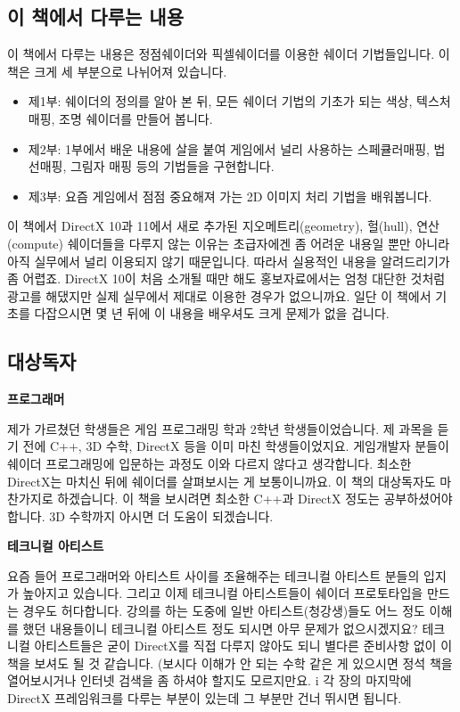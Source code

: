 \subsection{이 책에서 다루는 내용}

이 책에서 다루는 내용은 정점쉐이더와 픽셀쉐이더를 이용한 쉐이더 기법들입니다. 이 책은 크게 세 부분으로 나뉘어져 있습니다.

\begin{itemize}
    \item 제1부: 쉐이더의 정의를 알아 본 뒤, 모든 쉐이더 기법의 기초가 되는 색상, 텍스처 매핑, 조명 쉐이더를 만들어 봅니다.
    \item 제2부: 1부에서 배운 내용에 살을 붙여 게임에서 널리 사용하는 스페큘러매핑, 법선매핑, 그림자 매핑 등의 기법들을 구현합니다.
    \item 제3부: 요즘 게임에서 점점 중요해져 가는 2D 이미지 처리 기법을 배워봅니다.
\end{itemize}


이 책에서 DirectX 10과 11에서 새로 추가된 지오메트리(geometry), 헐(hull), 연산(compute) 쉐이더들을 다루지 않는 이유는 초급자에겐 좀 어려운 내용일 뿐만 아니라 아직 실무에서 널리 이용되지 않기 때문입니다. 따라서 실용적인 내용을 알려드리기가 좀 어렵죠. DirectX 10이 처음 소개될 때만 해도 홍보자료에서는 엄청 대단한 것처럼 광고를 해댔지만 실제 실무에서 제대로 이용한 경우가 없으니까요. 일단 이 책에서 기초를 다잡으시면 몇 년 뒤에  이 내용을 배우셔도 크게 문제가 없을 겁니다.

\subsection{대상독자}

\textbf{프로그래머}

제가 가르쳤던 학생들은 게임 프로그래밍 학과 2학년 학생들이었습니다. 제 과목을 듣기 전에 C++, 3D 수학, DirectX 등을 이미 마친 학생들이었지요. 게임개발자 분들이 쉐이더 프로그래밍에 입문하는 과정도 이와 다르지 않다고 생각합니다. 최소한 DirectX는 마치신 뒤에 쉐이더를 살펴보시는 게 보통이니까요. 이 책의 대상독자도 마찬가지로 하겠습니다. 이 책을 보시려면 최소한 C++과 DirectX 정도는 공부하셨어야 합니다. 3D 수학까지 아시면 더 도움이 되겠습니다.

\textbf{테크니컬 아티스트}

요즘 들어 프로그래머와 아티스트 사이를 조율해주는 테크니컬 아티스트 분들의 입지가 높아지고 있습니다. 그리고 이제 테크니컬 아티스트들이 쉐이더 프로토타입을 만드는 경우도 허다합니다. 강의를 하는 도중에 일반 아티스트(청강생)들도 어느 정도 이해를 했던 내용들이니 테크니컬 아티스트 정도 되시면 아무 문제가 없으시겠지요? 테크니컬 아티스트들은 굳이 DirectX를 직접 다루지 않아도 되니 별다른 준비사항 없이 이 책을 보셔도 될 것 같습니다. (보시다 이해가 안 되는 수학 같은 게 있으시면 정석 책을 열어보시거나 인터넷 검색을 좀 하셔야 할지도 모르지만요. ^^) 각 장의 마지막에 DirectX 프레임워크를 다루는 부분이 있는데 그 부분만 건너 뛰시면 됩니다.

